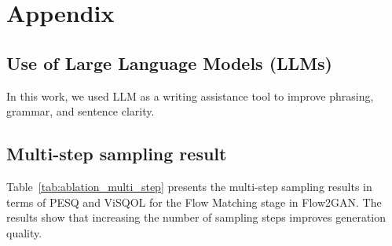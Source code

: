\documentclass{article} %
\begin{document}







\newpage
\appendix
\section{Appendix}

\subsection{Use of Large Language Models (LLMs)}

In this work, we used LLM as a writing assistance tool to improve phrasing, grammar, and sentence clarity.

\subsection{Multi-step sampling result}

Table~\ref{tab:ablation_multi_step} presents the multi-step sampling results in terms of PESQ and ViSQOL for the Flow Matching stage in Flow2GAN. The results show that increasing the number of sampling steps improves generation quality.

\begin{table}[h!]
\centering
\caption{Multi-step results on LibriTTS dev set for the Flow Matching stage of Flow2GAN.}
\label{tab:ablation_multi_step}
\setlength{\tabcolsep}{6pt} %
\end{table}
\end{document}
